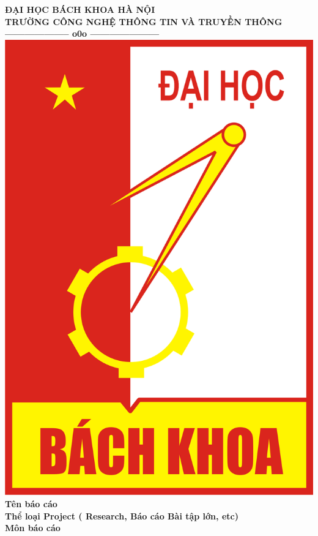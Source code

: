 \documentclass[12pt]{extreport}
\begin{document}
\thispagestyle{empty}
\thisfancypage{
	\setlength{\fboxsep}{0pt}
	\fbox}{}

\begin{center}

	{\fontsize{13pt}{1}\selectfont\textbf{ĐẠI HỌC BÁCH KHOA HÀ NỘI}}
	\\
	{\fontsize{13pt}{1}\selectfont\textbf{TRƯỜNG CÔNG NGHỆ THÔNG TIN VÀ TRUYỀN THÔNG}}
	\\
	\textbf{--------------------  o0o  ---------------------}\\[0.5cm]
	\includegraphics[scale=0.5]{images/Logo_Hust.png} \\[1.2cm]
	\textbf{{\large Tên báo cáo}}
	\textbf{}\\[1cm]
	\textbf{{\large Thể loại Project ( Research, Báo cáo Bài tập lớn, etc)}}\\[0.2cm]
	\textbf{{\large Môn báo cáo}}\\[1cm]
\end{center}
\end{document}
